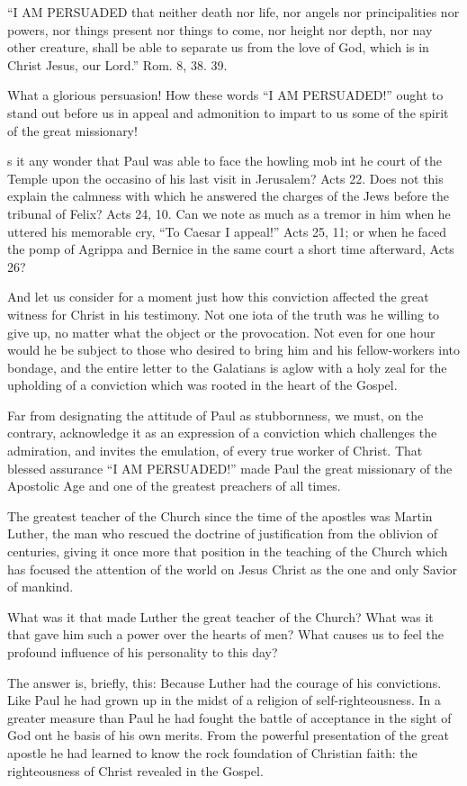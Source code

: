 \documentclass[
]{book}
\begin{document}
``I AM PERSUADED that neither death nor life, nor angels nor principalities nor powers, nor things present nor things to come, nor height nor depth, nor nay other creature, shall be able to separate us from the love of God, which is in Christ Jesus, our Lord.'' Rom. 8, 38. 39.

What a glorious persuasion! How these words ``I AM PERSUADED!'' ought to stand out before us in appeal and admonition to impart to us some of the spirit of the great missionary!

s it any wonder that Paul was able to face the howling mob int he court of the Temple upon the occasino of his last visit in Jerusalem? Acts 22. Does not this explain the calmness with which he answered the charges of the Jews before the tribunal of Felix? Acts 24, 10. Can we note as much as a tremor in him when he uttered his memorable cry, ``To Caesar I appeal!'' Acts 25, 11; or when he faced the pomp of Agrippa and Bernice in the same court a short time afterward, Acts 26?

And let us consider for a moment just how this conviction affected the great witness for Christ in his testimony. Not one iota of the truth was he willing to give up, no matter what the object or the provocation. Not even for one hour would he be subject to those who desired to bring him and his fellow-workers into bondage, and the entire letter to the Galatians is aglow with a holy zeal for the upholding of a conviction which was rooted in the heart of the Gospel.

Far from designating the attitude of Paul as stubbornness, we must, on the contrary, acknowledge it as an expression of a conviction which challenges the admiration, and invites the emulation, of every true worker of Christ. That blessed assurance ``I AM PERSUADED!'' made Paul the great missionary of the Apostolic Age and one of the greatest preachers of all times.

The greatest teacher of the Church since the time of the apostles was Martin Luther, the man who rescued the doctrine of justification from the oblivion of centuries, giving it once more that position in the teaching of the Church which has focused the attention of the world on Jesus Christ as the one and only Savior of mankind.

What was it that made Luther the great teacher of the Church? What was it that gave him such a power over the hearts of men? What causes us to feel the profound influence of his personality to this day?

The answer is, briefly, this: Because Luther had the courage of his convictions. Like Paul he had grown up in the midst of a religion of self-righteousness. In a greater measure than Paul he had fought the battle of acceptance in the sight of God ont he basis of his own merits. From the powerful presentation of the great apostle he had learned to know the rock foundation of Christian faith: the righteousness of Christ revealed in the Gospel.
\end{document}
